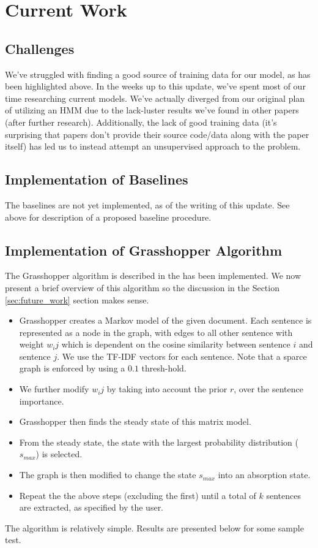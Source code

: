 \documentclass[10pt]{article}
\begin{document}
\section{Current Work}
\subsection{Challenges}
\label{sec:challenges}
We've struggled with finding a good source of training data for our model, as has been highlighted above. In the weeks up to this update, we've spent most of our time researching current models. We've actually diverged from our original plan of utilizing an HMM due to the lack-luster results we've found in other papers (after further research). Additionally, the lack of good training data (it's surprising that papers don't provide their source code/data along with the paper itself) has led us to instead attempt an unsupervised approach to the problem.

\subsection{Implementation of Baselines}
\label{sec:baseline}
The baselines are not yet implemented, as of the writing of this update. See above for description of a proposed baseline procedure.

\subsection{Implementation of Grasshopper Algorithm}
\label{sec:grasshopper}
The Grasshopper algorithm is described in the \cite{grasshopper} has been implemented. We now present a brief overview of this algorithm so the discussion in the Section \ref{sec:future_work} section makes sense.
\begin{itemize}
\item Grasshopper creates a Markov model of the given document. Each sentence is represented as a node in the graph, with edges to all other sentence with weight $w_ij$ which is dependent on the cosine similarity between sentence $i$ and sentence $j$. We use the TF-IDF vectors for each sentence. Note that a sparce graph is enforced by using a $0.1$ thresh-hold.
\item We further modify $w_ij$ by taking into account the prior $r$, over the sentence importance.
\item Grasshopper then finds the steady state of this matrix model.
\item From the steady state, the state with the largest probability distribution ($s_{max}$) is selected.
\item The graph is then modified to change the state $s_{max}$ into an absorption state.
\item Repeat the the above steps (excluding the first) until a total of $k$ sentences are extracted, as specified by the user.
\end{itemize}
The algorithm is relatively simple. Results are presented below for some sample test.
\end{document}
